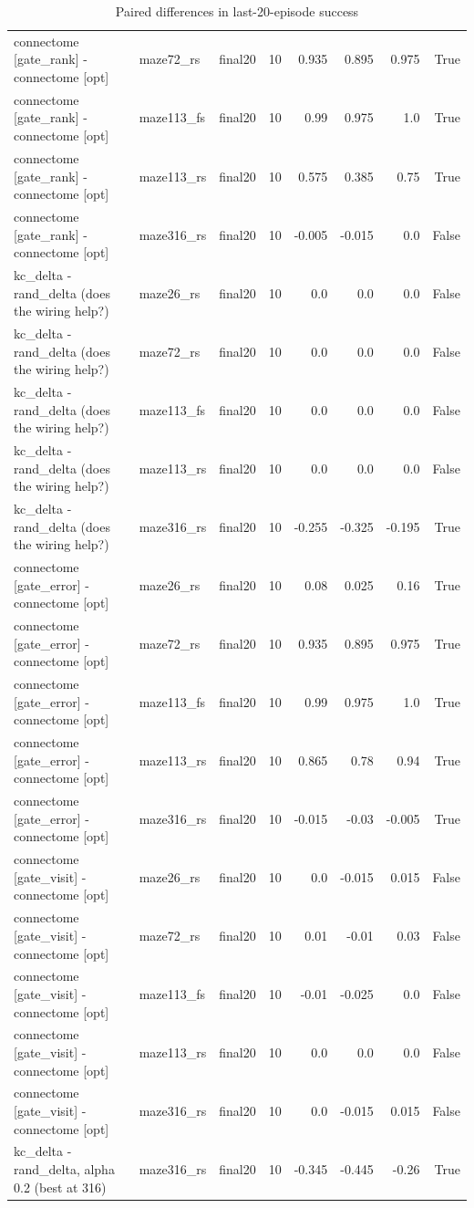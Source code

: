 \begin{table}[t]
\begin{tabular}{lllrrrrr}
connectome [gate\_rank] - connectome [opt] & maze72\_rs & final20 & 10 & 0.935 & 0.895 & 0.975 & True \\
connectome [gate\_rank] - connectome [opt] & maze113\_fs & final20 & 10 & 0.99 & 0.975 & 1.0 & True \\
connectome [gate\_rank] - connectome [opt] & maze113\_rs & final20 & 10 & 0.575 & 0.385 & 0.75 & True \\
connectome [gate\_rank] - connectome [opt] & maze316\_rs & final20 & 10 & -0.005 & -0.015 & 0.0 & False \\
kc\_delta - rand\_delta (does the wiring help?) & maze26\_rs & final20 & 10 & 0.0 & 0.0 & 0.0 & False \\
kc\_delta - rand\_delta (does the wiring help?) & maze72\_rs & final20 & 10 & 0.0 & 0.0 & 0.0 & False \\
kc\_delta - rand\_delta (does the wiring help?) & maze113\_fs & final20 & 10 & 0.0 & 0.0 & 0.0 & False \\
kc\_delta - rand\_delta (does the wiring help?) & maze113\_rs & final20 & 10 & 0.0 & 0.0 & 0.0 & False \\
kc\_delta - rand\_delta (does the wiring help?) & maze316\_rs & final20 & 10 & -0.255 & -0.325 & -0.195 & True \\
connectome [gate\_error] - connectome [opt] & maze26\_rs & final20 & 10 & 0.08 & 0.025 & 0.16 & True \\
connectome [gate\_error] - connectome [opt] & maze72\_rs & final20 & 10 & 0.935 & 0.895 & 0.975 & True \\
connectome [gate\_error] - connectome [opt] & maze113\_fs & final20 & 10 & 0.99 & 0.975 & 1.0 & True \\
connectome [gate\_error] - connectome [opt] & maze113\_rs & final20 & 10 & 0.865 & 0.78 & 0.94 & True \\
connectome [gate\_error] - connectome [opt] & maze316\_rs & final20 & 10 & -0.015 & -0.03 & -0.005 & True \\
connectome [gate\_visit] - connectome [opt] & maze26\_rs & final20 & 10 & 0.0 & -0.015 & 0.015 & False \\
connectome [gate\_visit] - connectome [opt] & maze72\_rs & final20 & 10 & 0.01 & -0.01 & 0.03 & False \\
connectome [gate\_visit] - connectome [opt] & maze113\_fs & final20 & 10 & -0.01 & -0.025 & 0.0 & False \\
connectome [gate\_visit] - connectome [opt] & maze113\_rs & final20 & 10 & 0.0 & 0.0 & 0.0 & False \\
connectome [gate\_visit] - connectome [opt] & maze316\_rs & final20 & 10 & 0.0 & -0.015 & 0.015 & False \\
kc\_delta - rand\_delta, alpha 0.2 (best at 316) & maze316\_rs & final20 & 10 & -0.345 & -0.445 & -0.26 & True \\
\bottomrule
\end{tabular}
\caption{Paired differences in last-20-episode success}
\label{tab:gridworld_paired}
\end{table}